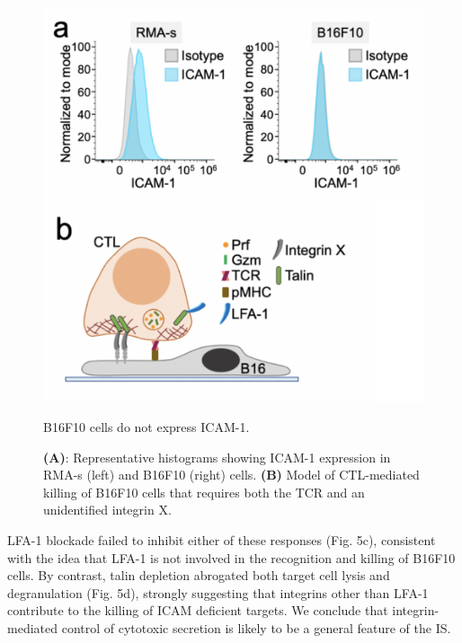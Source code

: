 \begin{figure}[htbp]
	\centering
	\includegraphics[width=1.0\columnwidth]{../figures/chapter3/fig5model.png}
	\caption{B16F10 cells do not express ICAM-1.}
	\caption*{\textbf{(A)}: Representative histograms showing ICAM-1 expression in RMA-s (left) and B16F10 (right) cells. \textbf{(B)} Model of CTL-mediated killing of B16F10 cells that requires both the TCR and an unidentified integrin X.}
	\label{fig:fig5model}
\end{figure} 

LFA-1 blockade failed to inhibit either of these responses (Fig. 5c), consistent with the idea that LFA-1 is not involved in the recognition and killing of B16F10 cells. By contrast, talin depletion abrogated both target cell lysis and degranulation (Fig. 5d), strongly suggesting that integrins other than LFA-1 contribute to the killing of ICAM deficient targets. We conclude that integrin-mediated control of cytotoxic secretion is likely to be a general feature of the IS.

